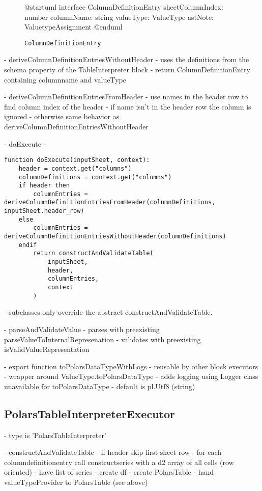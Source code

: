 \begin{figure}
	\begin{plantuml}
		@startuml
		interface ColumnDefinitionEntry {
				sheetColumnIndex: number
				columnName: string
				valueType: ValueType
				astNote: ValuetypeAssignment
			}
		@enduml
	\end{plantuml}
	\caption{\Verb|ColumnDefinitionEntry|}\label{fig:uml:ColumnDefinitionEntry}
\end{figure}


- deriveColumnDefinitionEntriesWithoutHeader
- uses the definitions from the schema property of the TableInterpreter block
- return ColumnDefinitionEntry containing columnname and valueType

- deriveColumnDefinitionEntriesFromHeader
- use names in the header row to find column index of the header
- if name isn't in the header row the column is ignored
- otherwise same behavior as deriveColumnDefinitionEntriesWithoutHeader

- doExecute
- \begin{listing}
	\begin{verbatim}
function doExecute(inputSheet, context):
	header = context.get("columns")
	columnDefinitions = context.get("columns")
	if header then
		columnEntries = deriveColumnDefinitionEntriesFromHeader(columnDefinitions, inputSheet.header_row)
	else
		columnEntries = deriveColumnDefinitionEntriesWithoutHeader(columnDefinitions)
	endif
		return constructAndValidateTable(
			inputSheet,
			header,
			columnEntries,
			context
		)
	\end{verbatim}
	\caption{}
	\label{lst:tableInterpreter:doExecute}
\end{listing}
- subclasses only override the abstract constructAndValidateTable.

- parseAndValidateValue
- parses with preexisting parseValueToInternalRepresenation
- validates with preexisting isValidValueRepresentation

- export function toPolarsDataTypeWithLogs
- reusable by other block executors
- wrapper around ValueType.toPolarsDataType
- adds logging using Logger class unavailable for toPolarsDataType
- default is pl.Utf8 (string)

\subsection{PolarsTableInterpreterExecutor}
- type is 'PolarsTableInterpreter'

- constructAndValidateTable
- if header skip first sheet row
- for each columndefinitionentry call constructseries with a d2 array of all cells (row oriented)
- have list of series
- create df
- create PolarsTable
- hand valueTypeProvider to PolarsTable (see above)

